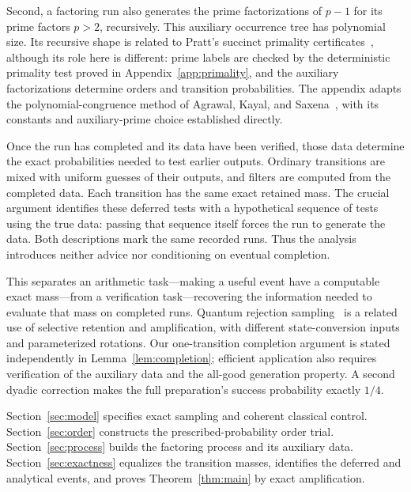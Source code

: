 Second, a factoring run also generates the prime factorizations of $p-1$
for its prime factors $p>2$, recursively. This auxiliary occurrence tree
has polynomial size. Its recursive shape is related to Pratt's succinct
primality certificates~\cite{Pratt}, although its role here is different:
prime labels are checked by the deterministic primality test proved in
Appendix~\ref{app:primality}, and the auxiliary factorizations determine
orders and transition probabilities. The appendix adapts the
polynomial-congruence method of Agrawal, Kayal, and Saxena~\cite{AKS}, with
its constants and auxiliary-prime choice established directly.

Once the run has completed and its data have been verified, those data
determine the exact probabilities needed to test earlier outputs. Ordinary
transitions are mixed with uniform guesses of their outputs, and filters
are computed from the completed data. Each transition has the same exact
retained mass. The crucial argument identifies these deferred tests with
a hypothetical sequence of tests using the true data: passing that
sequence itself forces the run to generate the data. Both descriptions
mark the same recorded runs. Thus the analysis introduces neither advice
nor conditioning on eventual completion.

This separates an arithmetic task---making a useful event have a
computable exact mass---from a verification task---recovering the
information needed to evaluate that mass on completed runs. Quantum
rejection sampling~\cite{ORR} is a related use of selective retention and
amplification, with different state-conversion inputs and parameterized
rotations. Our one-transition completion argument is stated independently
in Lemma~\ref{lem:completion}; efficient application also requires
verification of the auxiliary data and the all-good generation property.
A second dyadic correction makes the full preparation's success
probability exactly $1/4$.

Section~\ref{sec:model} specifies exact sampling and coherent classical
control. Section~\ref{sec:order} constructs the prescribed-probability
order trial. Section~\ref{sec:process} builds the factoring process and its
auxiliary data. Section~\ref{sec:exactness} equalizes the transition masses,
identifies the deferred and analytical events, and proves
Theorem~\ref{thm:main} by exact amplification.
